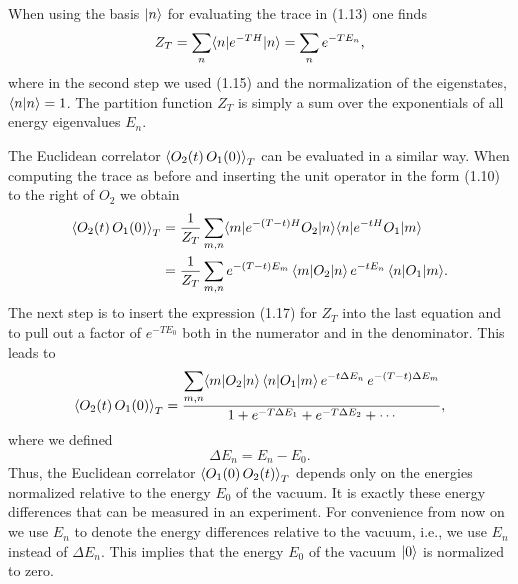When using the basis $|n\rangle$ for evaluating the trace in (1.13) one finds
\begin{equation}
  Z_T = \sum_n \langle n|e^{-TH}|n\rangle = \sum_n e^{-TE_n},
\end{equation}
where in the second step we used (1.15) and the normalization of the
eigenstates, $\langle n|n\rangle = 1$. The partition function $Z_T$ is simply a sum
over the exponentials of all energy eigenvalues $E_n$.

The Euclidean correlator $\left\langle O_2(t)\,O_1(0) \right\rangle_T$ can be evaluated in a similar
way. When computing the trace as before and inserting the unit operator in the
form (1.10) to the right of $O_2$ we obtain
\begin{align}
  \left\langle O_2(t)\,O_1(0) \right\rangle_T
  &= \frac{1}{Z_T}\sum_{m,n}\langle m|e^{-(T-t)H}O_2|n\rangle\langle n|e^{-tH}O_1|m\rangle \notag\\
  &= \frac{1}{Z_T}\sum_{m,n} e^{-(T-t)E_m}\,\langle m|O_2|n\rangle\,e^{-tE_n}\,\langle n|O_1|m\rangle.
\end{align}
The next step is to insert the expression (1.17) for $Z_T$ into the last
equation and to pull out a factor of $e^{-TE_0}$ both in the numerator and in
the denominator. This leads to
\begin{equation}
  \left\langle O_2(t)\,O_1(0) \right\rangle_T
  = \frac{\displaystyle\sum_{m,n}\langle m|O_2|n\rangle\,\langle n|O_1|m\rangle\,
       e^{-t\Delta E_n}\,e^{-(T-t)\Delta E_m}}
         {1 + e^{-T\Delta E_1} + e^{-T\Delta E_2} + \cdots},
\end{equation}
where we defined
\begin{equation}
  \Delta E_n = E_n - E_0.
\end{equation}
Thus, the Euclidean correlator $\left\langle O_1(0)\,O_2(t) \right\rangle_T$ depends only on the
energies normalized relative to the energy $E_0$ of the vacuum. It is exactly
these energy differences that can be measured in an experiment. For convenience
from now on we use $E_n$ to denote the energy differences relative to the
vacuum, i.e., we use $E_n$ instead of $\Delta E_n$. This implies that the
energy $E_0$ of the vacuum $|0\rangle$ is normalized to zero.

